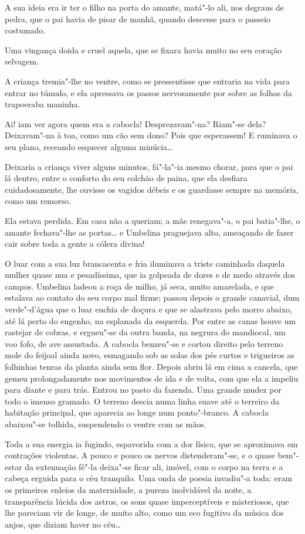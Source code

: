 A sua ideia era ir ter o filho na porta do amante, matá"-lo ali, nos
degraus de pedra, que o pai havia de pisar de manhã, quando descesse
para o passeio costumado.

Uma vingança doida e cruel aquela, que se fixara havia muito no seu
coração selvagem.

A criança tremia"-lhe no ventre, como se pressentisse que entraria na
vida para entrar no túmulo, e ela apressava os passos nervosamente por
sobre as folhas da trapoeraba maninha.

Ai! iam ver agora quem era a cabocla! Desprezavam"-na? Riam"-se dela?
Deixavam"-na à toa, como um cão sem dono? Pois que esperassem! E ruminava
o seu plano, receando esquecer alguma minúcia\ldots{}

Deixaria a criança viver alguns minutos, fá"-la"-ia mesmo chorar, para que
o pai lá dentro, entre o conforto do seu colchão de paina, que ela
desfiara cuidadosamente, lhe ouvisse os vagidos débeis e os guardasse
sempre na memória, como um remorso.

Ela estava perdida. Em casa não a queriam; a mãe renegava"-a, o pai
batia"-lhe, o amante fechava"-lhe as portas\ldots{} e Umbelina praguejava alto,
ameaçando de fazer cair sobre toda a gente a cólera divina!

O luar com a sua luz brancacenta e fria iluminava a triste caminhada
daquela mulher quase nua e pesadíssima, que ia golpeada de dores e de
medo através dos campos. Umbelina ladeou a roça de milho, já seca, muito
amarelada, e que estalava ao contato do seu corpo mal firme; passou
depois o grande canavial, dum verde"-d'água que o luar enchia de doçura e
que se alastrava pelo morro abaixo, até lá perto do engenho, na
esplanada da esquerda. Por entre as canas houve um rastejar de cobras, e
ergueu"-se da outra banda, na negrura do mandiocal, um voo fofo, de ave
assustada. A cabocla benzeu"-se e cortou direito pelo terreno mole do
feijoal ainda novo, esmagando sob as solas dos pés curtos e trigueiros
as folhinhas tenras da planta ainda sem flor. Depois abriu lá em cima a
cancela, que gemeu prolongadamente nos movimentos de ida e de volta, com
que ela a impeliu para diante e para trás. Entrou no pasto da fazenda.
Uma grande mudez por todo o imenso gramado. O terreno descia numa linha
suave até o terreiro da habitação principal, que aparecia ao longe num
ponto"-branco. A cabocla abaixou"-se tolhida, suspendendo o ventre com as
mãos.

Toda a sua energia ia fugindo, espavorida com a dor física, que se
aproximava em contrações violentas. A pouco e pouco os nervos
distenderam"-se, e o quase bem"-estar da extenuação fê"-la deixa"-se ficar
ali, imóvel, com o corpo na terra e a cabeça erguida para o céu
tranquilo. Uma onda de poesia invadiu"-a toda: eram os primeiros enleios
da maternidade, a pureza inolvidável da noite, a transparência lúcida
dos astros, os sons quase imperceptíveis e misteriosos, que lhe pareciam
vir de longe, de muito alto, como um eco fugitivo da música dos anjos,
que diziam haver no céu\ldots{}

